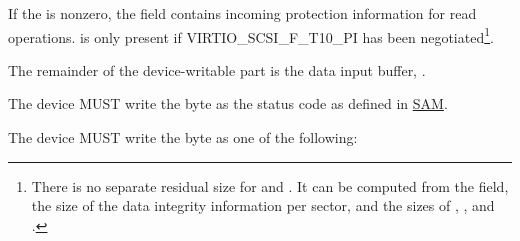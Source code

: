 If the  is nonzero, the  field contains
incoming protection information for read operations.   is
only present if VIRTIO_SCSI_F_T10_PI has been negotiated\footnote{There
  is no separate residual size for  and
  .  It can be computed from the  field,
  the size of the data integrity information per sector, and the sizes
  of , ,  and .}.

The remainder of the device-writable part is the data input buffer,
.



The device MUST write the  byte as the status code as
defined in \hyperref[intro:SAM]{SAM}.

The device MUST write the  byte as one of the following:

